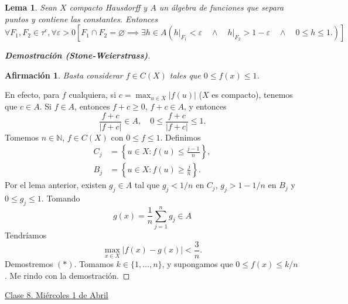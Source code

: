 \documentclass{article}
\newtheorem{claim}{Afirmación}
\newtheorem{lemma}[theorem]{Lema}
\theoremstyle{definition}
\theoremstyle{remark}
\numberwithin{equation}{section}
\newcommand{\N}{\mathbb{N}}
\newcommand{\e}{\varepsilon}
\newcommand{\abs}[1]{\left| #1 \right|}
\newcommand{\br}[1]{\left( #1 \right)}
\newcommand{\set}[1]{\left\{ #1 \right\}}
\newcommand{\cor}[1]{\left[ #1 \right]}
\newcommand{\fecha}[1]{\begin{flushright} \underline{#1} \end{flushright}}
\newcommand{\dem}[1]{\textbf{Demostración (#1)}}
\begin{document}
\begin{lemma}
  Sean $X$ compacto Hausdorff y $A$ un álgebra de funciones que separa puntos y contiene las constantes. Entonces
  \[\forall F_1,F_2 \in \tau^c, \forall \e>0 \cor{
    F_1 \cap F_2 = \varnothing \implies \exists h \in A \br{
      h\vert_{F_1} < \e \quad\land\quad h\vert_{F_2} > 1-\e \quad\land\quad 0 \leq h \leq 1.
    }
  }\]
\end{lemma}

\begin{proof}
  [\dem{Stone-Weierstrass}]
  \begin{claim}
    Basta considerar $f \in C(X)$ tales que $0 \leq f(x) \leq 1$.
  \end{claim}
  En efecto, para $f$ cualquiera, si $c = \max_{u \in X} \abs{f(u)}$ ($X$ es compacto), tenemos que $c \in A$.
  Si $f \in A$, entonces $f+c \geq 0$, $f+c \in A$, y entonces
  \[\frac{f+c}{\abs{f+c}} \in A, \quad 0 \leq \frac{f+c}{\abs{f+c}} \leq 1.\]
  Tomemos $n \in \N$, $f \in C(X)$ con $0 \leq f \leq 1$. Definimos
  \begin{align*}
    C_j &= \set{u \in X \colon f(u) \leq \frac{j-1}{n}}, \\
    B_j &= \set{u \in X \colon f(u) \geq \frac{j}{n}}.
  \end{align*}
  Por el lema anterior, existen $g_j \in A$ tal que $g_j < 1/n$ en $C_j$, $g_j > 1 - 1/n$ en $B_j$ y $0 \leq g_j \leq 1$.
  Tomando
  \[g(x) = \frac{1}{n} \sum_{j=1}^n g_j \in A\]
  Tendríamos
  \[\tag{$*$} \max_{x \in X} \abs{f(x) - g(x)} < \frac{3}{n}.\]
  Demostremos $(*)$. Tomamos $k \in \{1,\dots,n\}$, y supongamos que $0 \leq f(x) \leq k/n$.
  Me rindo con la demostración.
\end{proof}

\fecha{Clase 8. Miércoles 1 de Abril}
\end{document}
